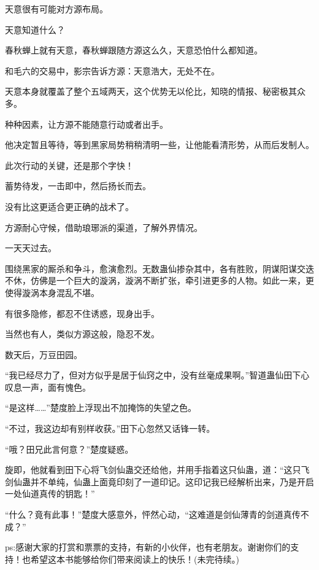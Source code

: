 \begin{this_body}
天意很有可能对方源布局。

天意知道什么？

春秋蝉上就有天意，春秋蝉跟随方源这么久，天意恐怕什么都知道。

和毛六的交易中，影宗告诉方源：天意浩大，无处不在。

天意本身就覆盖了整个五域两天，这个优势无以伦比，知晓的情报、秘密极其众多。

种种因素，让方源不能随意行动或者出手。

他决定暂且等待，等到黑家局势稍稍清明一些，让他能看清形势，从而后发制人。

此次行动的关键，还是那个字快！

蓄势待发，一击即中，然后扬长而去。

没有比这更适合更正确的战术了。

方源耐心守候，借助琅琊派的渠道，了解外界情况。

一天天过去。

围绕黑家的厮杀和争斗，愈演愈烈。无数蛊仙掺杂其中，各有胜败，阴谋阳谋交迭不休，仿佛是一个巨大的漩涡，漩涡不断扩张，牵引进更多的人物。如此一来，更使得漩涡本身混乱不堪。

有很多隐修，都忍不住诱惑，现身出手。

当然也有人，类似方源这般，隐忍不发。

数天后，万豆田园。

“我已经尽力了，但对方似乎是居于仙窍之中，没有丝毫成果啊。”智道蛊仙田下心叹息一声，面有愧色。

“是这样……”楚度脸上浮现出不加掩饰的失望之色。

“不过，我这边却有别样收获。”田下心忽然又话锋一转。

“哦？田兄此言何意？”楚度疑惑。

旋即，他就看到田下心将飞剑仙蛊交还给他，并用手指着这只仙蛊，道：“这只飞剑仙蛊并不单纯，仙蛊上面竟印刻了一道印记。这印记我已经解析出来，乃是开启一处仙道真传的钥匙！”

“什么？竟有此事！”楚度大感意外，怦然心动，“这难道是剑仙薄青的剑道真传不成？”

ps:感谢大家的打赏和票票的支持，有新的小伙伴，也有老朋友。谢谢你们的支持！也希望这本书能够给你们带来阅读上的快乐！(未完待续。)

\end{this_body}

